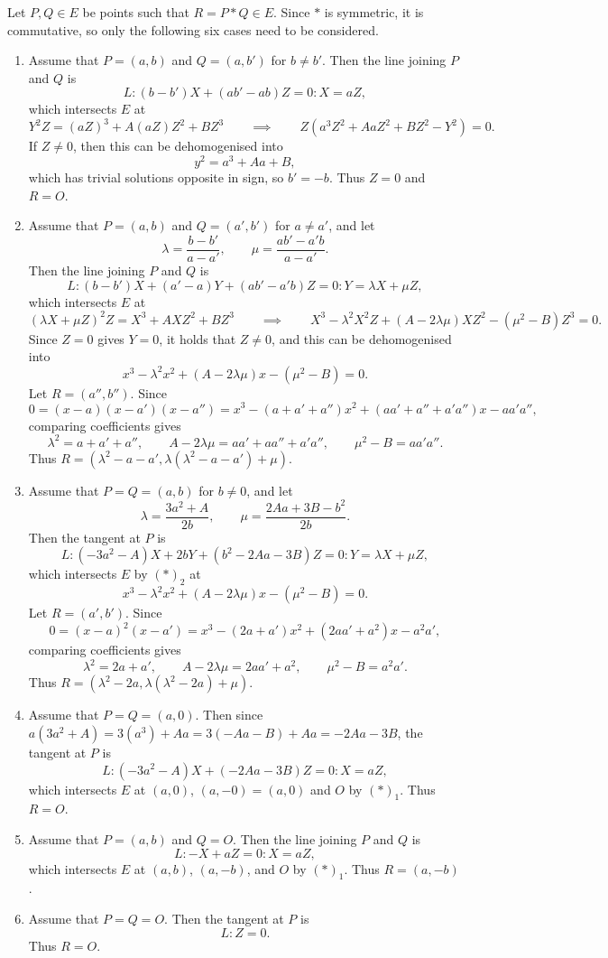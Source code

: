 \documentclass{article}
\newcommand{\rb}[1]{\left( #1 \right)}
\theoremstyle{definition}\newtheorem*{definition}{Definition}
\theoremstyle{definition}\newtheorem*{example}{Example}
\theoremstyle{definition}\newtheorem*{remark}{Remark}
\begin{document}
Let $ P, Q \in E $ be points such that $ R = P * Q \in E $. Since $ * $ is symmetric, it is commutative, so only the following six cases need to be considered.
\begin{enumerate}[label=$ \rb{*}_\arabic* $]
\item Assume that $ P = \rb{a, b} $ and $ Q = \rb{a, b'} $ for $ b \ne b' $. Then the line joining $ P $ and $ Q $ is
$$ L : \rb{b - b'}X + \rb{ab' - ab}Z = 0 : X = aZ, $$
which intersects $ E $ at
$$ Y^2Z = \rb{aZ}^3 + A\rb{aZ}Z^2 + BZ^3 \qquad \implies \qquad Z\rb{a^3Z^2 + AaZ^2 + BZ^2 - Y^2} = 0. $$
If $ Z \ne 0 $, then this can be dehomogenised into
$$ y^2 = a^3 + Aa + B, $$
which has trivial solutions opposite in sign, so $ b' = -b $. Thus $ Z = 0 $ and $ R = O $.
\item Assume that $ P = \rb{a, b} $ and $ Q = \rb{a', b'} $ for $ a \ne a' $, and let
$$ \lambda = \dfrac{b - b'}{a - a'}, \qquad \mu = \dfrac{ab' - a'b}{a - a'}. $$
Then the line joining $ P $ and $ Q $ is
$$ L : \rb{b - b'}X + \rb{a' - a}Y + \rb{ab' - a'b}Z = 0 : Y = \lambda X + \mu Z, $$
which intersects $ E $ at
$$ \rb{\lambda X + \mu Z}^2Z = X^3 + AXZ^2 + BZ^3 \qquad \implies \qquad X^3 - \lambda^2X^2Z + \rb{A - 2\lambda\mu}XZ^2 - \rb{\mu^2 - B}Z^3 = 0. $$
Since $ Z = 0 $ gives $ Y = 0 $, it holds that $ Z \ne 0 $, and this can be dehomogenised into
$$ x^3 - \lambda^2x^2 + \rb{A - 2\lambda\mu}x - \rb{\mu^2 - B} = 0. $$
Let $ R = \rb{a'', b''} $. Since
$$ 0 = \rb{x - a}\rb{x - a'}\rb{x - a''} = x^3 - \rb{a + a' + a''}x^2 + \rb{aa' + a'' + a'a''}x - aa'a'', $$
comparing coefficients gives
$$ \lambda^2 = a + a' + a'', \qquad A - 2\lambda\mu = aa' + aa'' + a'a'', \qquad \mu^2 - B = aa'a''. $$
Thus $ R = \rb{\lambda^2 - a - a', \lambda\rb{\lambda^2 - a - a'} + \mu} $.
\item Assume that $ P = Q = \rb{a, b} $ for $ b \ne 0 $, and let
$$ \lambda = \dfrac{3a^2 + A}{2b}, \qquad \mu = \dfrac{2Aa + 3B - b^2}{2b}. $$
Then the tangent at $ P $ is
$$ L : \rb{-3a^2 - A}X + 2bY + \rb{b^2 - 2Aa - 3B}Z = 0 : Y = \lambda X + \mu Z, $$
which intersects $ E $ by $ \rb{*}_2 $ at
$$ x^3 - \lambda^2x^2 + \rb{A - 2\lambda\mu}x - \rb{\mu^2 - B} = 0. $$
Let $ R = \rb{a', b'} $. Since
$$ 0 = \rb{x - a}^2\rb{x - a'} = x^3 - \rb{2a + a'}x^2 + \rb{2aa' + a^2}x - a^2a', $$
comparing coefficients gives
$$ \lambda^2 = 2a + a', \qquad A - 2\lambda\mu = 2aa' + a^2, \qquad \mu^2 - B = a^2a'. $$
Thus $ R = \rb{\lambda^2 - 2a, \lambda\rb{\lambda^2 - 2a} + \mu} $.
\item Assume that $ P = Q = \rb{a, 0} $. Then since $ a\rb{3a^2 + A} = 3\rb{a^3} + Aa = 3\rb{-Aa - B} + Aa = -2Aa - 3B $, the tangent at $ P $ is
$$ L : \rb{-3a^2 - A}X + \rb{-2Aa - 3B}Z = 0 : X = aZ, $$
which intersects $ E $ at $ \rb{a, 0} $, $ \rb{a, -0} = \rb{a, 0} $ and $ O $ by $ \rb{*}_1 $. Thus $ R = O $.
\item Assume that $ P = \rb{a, b} $ and $ Q = O $. Then the line joining $ P $ and $ Q $ is
$$ L : -X + aZ = 0 : X = aZ, $$
which intersects $ E $ at $ \rb{a, b} $, $ \rb{a, -b} $, and $ O $ by $ \rb{*}_1 $. Thus $ R = \rb{a, -b} $.
\item Assume that $ P = Q = O $. Then the tangent at $ P $ is
$$ L : Z = 0. $$
Thus $ R = O $.
\end{enumerate}
\end{document}
